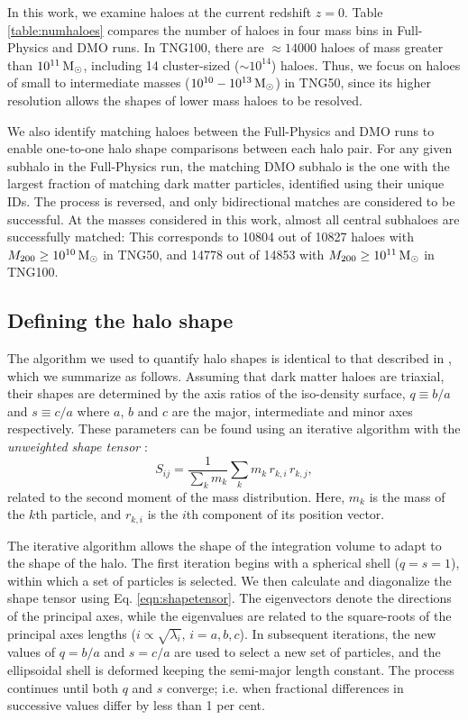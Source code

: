 \documentclass[fleqn,usenatbib]{mnras}
\def\msun{\,\rm M_{\odot}}
\begin{document}
In this work, we examine haloes at the current redshift $z=0$. 
Table \ref{table:numhaloes} compares the number of haloes in four mass bins in Full-Physics and DMO runs.
In TNG100, there are $\approx 14000$ haloes of mass greater than $10^{11} \msun$, including 14 cluster-sized ($\sim 10^{14}$) haloes.
Thus, we focus on haloes of small to intermediate masses ($10^{10} - 10^{13} \msun$) in TNG50, since its higher resolution allows the shapes of lower mass haloes to be resolved.

We also identify matching haloes between the Full-Physics and DMO runs to enable one-to-one halo shape comparisons between each halo pair.
For any given subhalo in the Full-Physics run, the matching DMO subhalo is the one with the largest fraction of matching dark matter particles, identified using their unique IDs.
The process is reversed, and only bidirectional matches are considered to be successful.
At the masses considered in this work, almost all central subhaloes are successfully matched:
This corresponds to 10804 out of 10827 haloes with $M_{200} \ge 10^{10} \msun$ in TNG50, and 14778 out of 14853 with $M_{200} \ge 10^{11} \msun$ in TNG100.


\subsection{Defining the halo shape}

The algorithm we used to quantify halo shapes is identical to that described in \cite{Chua19v484}, which we summarize as follows.
Assuming that dark matter haloes are triaxial, their shapes are determined by the axis ratios of the iso-density surface, $q\equiv b/a$ and $s\equiv c/a$ where $a$, $b$ and $c$ are the major, intermediate and minor axes respectively.
These parameters can be found using an iterative algorithm with the  {\it unweighted shape tensor} \citep[e.g.][]{Bailin05v627,Zemp11v197}:
\begin{equation}
	S_{ij} = \frac{1}{\sum_k m_k} \sum_k  m_k\, r_{k,i} \,r_{k,j},
	\label{eqn:shapetensor}
\end{equation}
related to the second moment of the mass distribution.
Here, $m_k$ is the mass of the $k$th particle, and $r_{k,i}$ is the $i$th component of its position vector.

The iterative algorithm allows the shape of the integration volume to adapt to the shape of the halo.
The first iteration begins with a spherical shell ($q=s=1$), within which a set of particles is selected. 
We then calculate and diagonalize the shape tensor using Eq. \ref{eqn:shapetensor}. 
The eigenvectors denote the directions of the principal axes, while the eigenvalues are related to the square-roots of the principal axes lengths ($i\propto\sqrt{\lambda_i}, \, i = a,b,c$).
In subsequent iterations, the new values of $q=b/a$ and $s=c/a$ are used to select a new set of particles, and the ellipsoidal shell is deformed keeping the semi-major length constant.
The process continues until both $q$ and $s$ converge; i.e. when fractional differences in successive values differ by less than 1 per cent.
\end{document}
